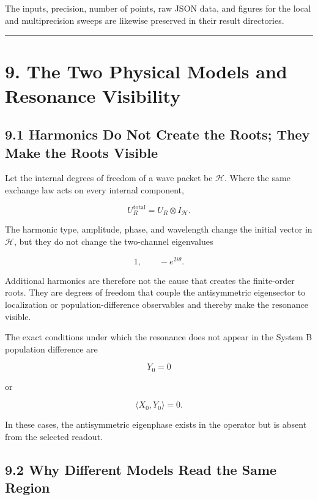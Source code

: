 \documentclass[
  10pt,
  a4paper,
]{article}
\begin{document}
The inputs, precision, number of points, raw JSON data, and figures for
the local and multiprecision sweeps are likewise preserved in their
result directories.

\begin{center}\rule{0.5\linewidth}{0.5pt}\end{center}

\section{9. The Two Physical Models and Resonance
Visibility}\label{the-two-physical-models-and-resonance-visibility}

\subsection{9.1 Harmonics Do Not Create the Roots; They Make the Roots
Visible}\label{harmonics-do-not-create-the-roots-they-make-the-roots-visible}

Let the internal degrees of freedom of a wave packet be \(\mathcal H\).
Where the same exchange law acts on every internal component,

\[
U_R^{\mathrm{total}}
=U_R\otimes I_{\mathcal H}.
\]

The harmonic type, amplitude, phase, and wavelength change the initial
vector in \(\mathcal H\), but they do not change the two-channel
eigenvalues

\[
1,\qquad -e^{2i\theta}.
\]

Additional harmonics are therefore not the cause that creates the
finite-order roots. They are degrees of freedom that couple the
antisymmetric eigensector to localization or population-difference
observables and thereby make the resonance visible.

The exact conditions under which the resonance does not appear in the
System B population difference are

\[
Y_0=0
\]

or

\[
\langle X_0,Y_0\rangle=0.
\]

In these cases, the antisymmetric eigenphase exists in the operator but
is absent from the selected readout.

\subsection{9.2 Why Different Models Read the Same
Region}\label{why-different-models-read-the-same-region}
\end{document}
